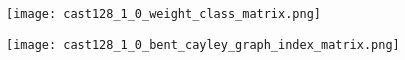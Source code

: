 \begin{figure}[!hb]
\centering
\begin{minipage}{.48\textwidth}
  \centering
\texttt{[image: cast128\_1\_0\_weight\_class\_matrix.png]}
  \label{fig:cast128_1_0_weight_class_matrix}
\end{minipage}
\begin{minipage}{.48\textwidth}
  \centering
\texttt{[image: cast128\_1\_0\_bent\_cayley\_graph\_index\_matrix.png]}
  \label{fig:cast128_1_0_bent_cayley_graph_index_matrix}
\end{minipage}%
\end{figure}

